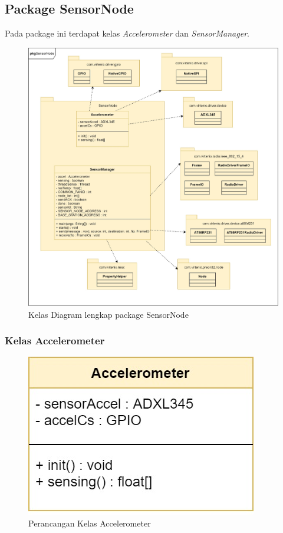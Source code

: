 \subsection{Package SensorNode}
Pada package ini terdapat kelas \textit{Accelerometer} dan \textit{SensorManager}.
\begin{figure}[H] 
	\centering  
	\includegraphics[scale=0.25]{Gambar/class_sensorNode.jpg}
	\caption[Kelas Diagram lengkap package SensorNode]{Kelas Diagram lengkap package SensorNode}
	\label{fig:class_sensorNode} 
\end{figure}

\subsubsection{Kelas Accelerometer}
\begin{figure}[H] 
	\centering  
	\includegraphics[scale=0.4]{Gambar/accelerometer_class.jpg}
	\caption[Perancangan Kelas Accelerometer]{Perancangan Kelas Accelerometer}
	\label{fig:accleromter_class} 
\end{figure}

